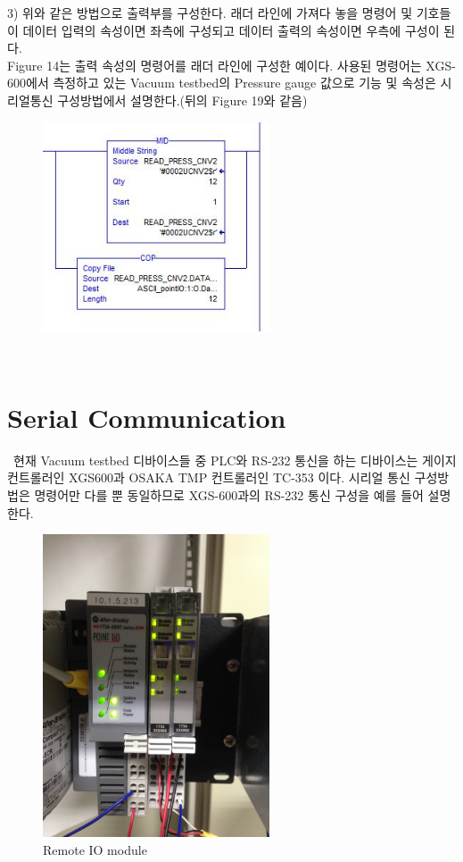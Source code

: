 \documentclass[11pt
  , a4paper
  , article
  , oneside
]{memoir}
\begin{document}
3) 위와 같은 방법으로 출력부를 구성한다. 래더 라인에 가져다 놓을 명령어 및 기호들이 데이터 입력의 속성이면 좌측에 구성되고 데이터 출력의 속성이면 우측에 구성이 된다.\\

Figure 14는 출력 속성의 명령어를 래더 라인에 구성한 예이다. 사용된 명령어는 XGS-600에서 측정하고 있는 Vacuum testbed의 Pressure gauge 값으로 기능 및 속성은 시리얼통신 구성방법에서 설명한다.(뒤의 Figure 19와 같음)
 
\begin{figure}[h]
	\centering
	\includegraphics[width=0.6\textwidth]{./picture/ladder_com.JPG}
	\caption{}
	\label{fig:}
\end{figure}  \
 
\newpage

\section{Serial Communication}\
현재 Vacuum testbed 디바이스들 중 PLC와 RS-232 통신을 하는 디바이스는 게이지 컨트롤러인 XGS600과 OSAKA TMP 컨트롤러인 TC-353 이다. 시리얼 통신 구성방법은 명령어만 다를 뿐 동일하므로 XGS-600과의 RS-232 통신 구성을 예를 들어 설명한다.\

 \begin{figure}[h]
 	\centering
 	\includegraphics[width=0.6\textwidth]{./picture/pointIO.JPG}
 	\caption{Remote IO module}
 	\label{fig:}
 \end{figure}  \
\end{document}
